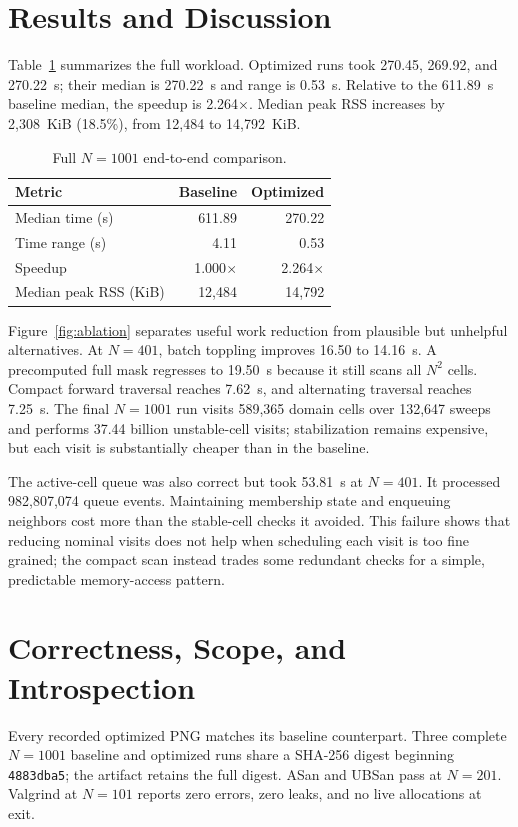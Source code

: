 \documentclass[sigplan,screen,nonacm]{acmart}
\begin{document}
\balance
\section{Results and Discussion}
Table~\ref{tab:full} summarizes the full workload. Optimized runs took 270.45,
269.92, and 270.22~s; their median is 270.22~s and range is 0.53~s. Relative to
the 611.89~s baseline median, the speedup is 2.264$\times$. Median peak RSS
increases by 2,308~KiB (18.5\%), from 12,484 to 14,792~KiB.

\begin{table}[t]
  \centering
  \caption{Full $N=1001$ end-to-end comparison.}
  \label{tab:full}
  \begin{tabular}{lrr}
    \toprule
    Metric & Baseline & Optimized \\
    \midrule
    Median time (s) & 611.89 & 270.22 \\
    Time range (s) & 4.11 & 0.53 \\
    Speedup & 1.000$\times$ & 2.264$\times$ \\
    Median peak RSS (KiB) & 12,484 & 14,792 \\
    \bottomrule
  \end{tabular}
\end{table}

Figure~\ref{fig:ablation} separates useful work reduction from plausible but
unhelpful alternatives. At $N=401$, batch toppling improves 16.50 to 14.16~s.
A precomputed full mask regresses to 19.50~s because it still scans all $N^2$
cells. Compact forward traversal reaches 7.62~s, and alternating traversal
reaches 7.25~s. The final $N=1001$ run visits 589,365 domain cells over 132,647
sweeps and performs 37.44 billion unstable-cell visits; stabilization remains
expensive, but each visit is substantially cheaper than in the baseline.

The active-cell queue was also correct but took 53.81~s at $N=401$. It
processed 982,807,074 queue events. Maintaining membership state and enqueuing
neighbors cost more than the stable-cell checks it avoided. This failure shows
that reducing nominal visits does not help when scheduling each visit is too
fine grained; the compact scan instead trades some redundant checks for a
simple, predictable memory-access pattern.

\section{Correctness, Scope, and Introspection}
Every recorded optimized PNG matches its baseline counterpart. Three complete
$N=1001$ baseline and optimized runs share a SHA-256 digest beginning
\texttt{4883dba5}; the artifact retains the full digest.
ASan and UBSan pass at $N=201$. Valgrind at $N=101$ reports zero errors, zero
leaks, and no live allocations at exit.
\end{document}
